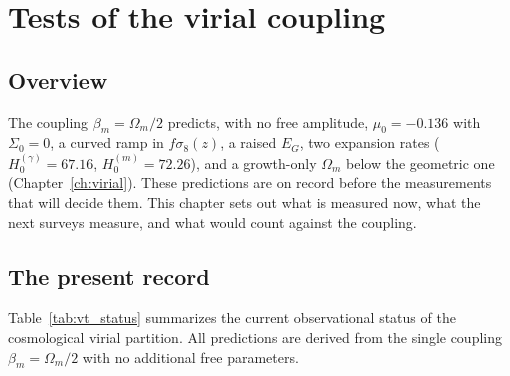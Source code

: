 
\chapter{Tests of the virial coupling}\label{ch:virial_tests}

\section*{Overview}
The coupling $\beta_m=\Omega_m/2$ predicts, with no free amplitude, $\mu_0=-0.136$ with $\Sigma_0=0$, a curved ramp in $f\sigma_8(z)$, a raised $E_G$,
two expansion rates ($H_0^{(\gamma)}=67.16$, $H_0^{(m)}=72.26$), and a growth-only $\Omega_m$ below the geometric one (Chapter~\ref{ch:virial}). These
predictions are on record before the measurements that will decide them. This chapter sets out what is measured now, what the next surveys measure, and what
would count against the coupling.

\section{The present record}\label{sec:vt_record}
Table~\ref{tab:vt_status} summarizes the current observational status of the cosmological virial partition. All predictions are derived from the single
coupling $\beta_m=\Omega_m/2$ with no additional free parameters.

